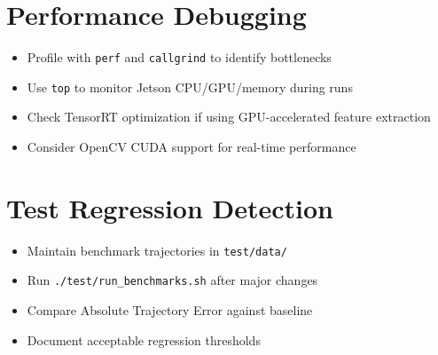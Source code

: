 \section{Performance Debugging}

\begin{itemize}
    \item Profile with \texttt{perf} and \texttt{callgrind} to identify bottlenecks
    \item Use \texttt{top} to monitor Jetson CPU/GPU/memory during runs
    \item Check TensorRT optimization if using GPU-accelerated feature extraction
    \item Consider OpenCV CUDA support for real-time performance
\end{itemize}

\section{Test Regression Detection}

\begin{itemize}
    \item Maintain benchmark trajectories in \texttt{test/data/}
    \item Run \texttt{./test/run\_benchmarks.sh} after major changes
    \item Compare Absolute Trajectory Error against baseline
    \item Document acceptable regression thresholds
\end{itemize}







